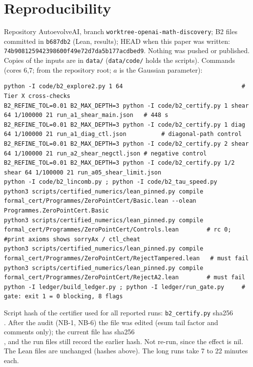 \documentclass[10pt]{article}
\begin{document}
\section{Reproducibility}\label{sec:repro}
Repository AutoevolveAI, branch \texttt{worktree-openai-math-discovery}; B2 files committed in \texttt{b687db2} (Lean, results); HEAD when this paper was written: \texttt{74b908125942398600f49e72d7da5b177acdbed9}. Nothing was pushed or published. Copies of the inputs are in \texttt{data/} (\texttt{data/code/} holds the scripts). Commands (cores 6,7; from the repository root; $a$ is the Gaussian parameter):
\begin{lstlisting}[basicstyle=\ttfamily\scriptsize]
python -I code/b2_explore2.py 1 64                                  # Tier X cross-checks
B2_REFINE_TOL=0.01 B2_MAX_DEPTH=3 python -I code/b2_certify.py 1 shear 64 1/100000 21 run_a1_shear_main.json   # 448 s
B2_REFINE_TOL=0.01 B2_MAX_DEPTH=3 python -I code/b2_certify.py 1 diag 64 1/100000 21 run_a1_diag_ctl.json          # diagonal-path control
B2_REFINE_TOL=0.01 B2_MAX_DEPTH=3 python -I code/b2_certify.py 2 shear 64 1/100000 21 run_a2_shear_negctl.json # negative control
B2_REFINE_TOL=0.01 B2_MAX_DEPTH=3 python -I code/b2_certify.py 1/2 shear 64 1/100000 21 run_a05_shear_limit.json
python -I code/b2_lincomb.py ; python -I code/b2_tau_speed.py
python3 scripts/certified_numerics/lean_pinned.py compile formal_cert/Programmes/ZeroPointCert/Basic.lean --olean Programmes.ZeroPointCert.Basic
python3 scripts/certified_numerics/lean_pinned.py compile formal_cert/Programmes/ZeroPointCert/Controls.lean        # rc 0; #print axioms shows sorryAx / ctl_cheat
python3 scripts/certified_numerics/lean_pinned.py compile formal_cert/Programmes/ZeroPointCert/RejectTampered.lean   # must fail
python3 scripts/certified_numerics/lean_pinned.py compile formal_cert/Programmes/ZeroPointCert/RejectA2.lean        # must fail
python -I ledger/build_ledger.py ; python -I ledger/run_gate.py     # gate: exit 1 = 0 blocking, 8 flags
\end{lstlisting}
Script hash of the certifier used for all reported runs: \texttt{b2\_certify.py} sha256 \\. After the audit (NB-1, NB-6) the file was edited (esum tail factor and comments only); the current file has sha256 \\, and the run files still record the earlier hash. Not re-run, since the effect is nil. The Lean files are unchanged (hashes above). The long runs take 7 to 22 minutes each.
\end{document}
